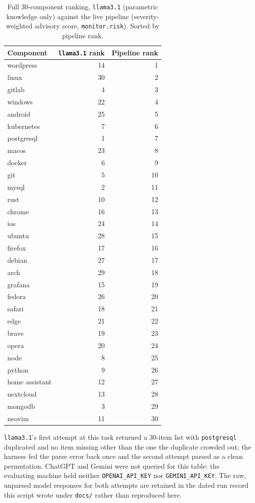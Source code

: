 \documentclass[acmsmall,anonymous,screen]{acmart}
\begin{document}
\begin{table}[h]
\caption{Full 30-component ranking, \texttt{llama3.1} (parametric knowledge
only) against the live pipeline (severity-weighted advisory score,
\texttt{monitor.risk}). Sorted by pipeline rank.}
\label{tab:update-order-full}
\begin{tabular}{lrr}
\toprule
Component & \texttt{llama3.1} rank & Pipeline rank \\
\midrule
wordpress       & 14 & 1 \\
linux           & 30 & 2 \\
gitlab          & 4  & 3 \\
windows         & 22 & 4 \\
android         & 25 & 5 \\
kubernetes      & 7  & 6 \\
postgresql      & 1  & 7 \\
macos           & 23 & 8 \\
docker          & 6  & 9 \\
git             & 5  & 10 \\
mysql           & 2  & 11 \\
rust            & 10 & 12 \\
chrome          & 16 & 13 \\
ios             & 24 & 14 \\
ubuntu          & 28 & 15 \\
firefox         & 17 & 16 \\
debian          & 27 & 17 \\
arch            & 29 & 18 \\
grafana         & 15 & 19 \\
fedora          & 26 & 20 \\
safari          & 18 & 21 \\
edge            & 21 & 22 \\
brave           & 19 & 23 \\
opera           & 20 & 24 \\
node            & 8  & 25 \\
python          & 9  & 26 \\
home assistant  & 12 & 27 \\
nextcloud       & 13 & 28 \\
mongodb         & 3  & 29 \\
neovim          & 11 & 30 \\
\bottomrule
\end{tabular}
\end{table}

\texttt{llama3.1}'s first attempt at this task returned a 30-item list with
\texttt{postgresql} duplicated and no item missing other than the one the
duplicate crowded out; the harness fed the parse error back once and the
second attempt parsed as a clean permutation. ChatGPT and Gemini were not
queried for this table: the evaluating machine held neither
\texttt{OPENAI\_API\_KEY} nor \texttt{GEMINI\_API\_KEY}. The raw, unparsed
model responses for both attempts are retained in the dated run record this
script wrote under \texttt{docs/} rather than reproduced here.



\end{document}
